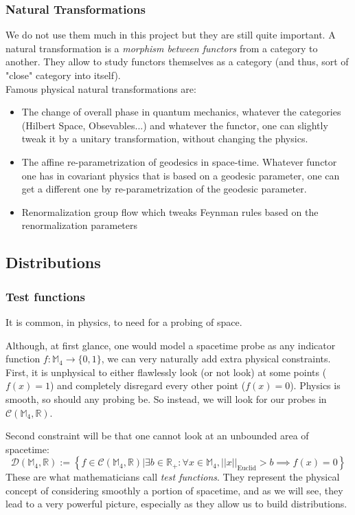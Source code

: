 \documentclass[a4paper,11pt]{article}
\numberwithin{equation}{section}
\theoremstyle{definition}
\begin{document}
    \subsubsection{Natural Transformations}
    We do not use them much in this project but they are still quite important. A natural transformation is a \emph{morphism between functors} from a category to another. They allow to study functors themselves as a category (and thus, sort of "close" category into itself).\\
    Famous physical natural transformations are:
    \begin{itemize}
        \item The change of overall phase in quantum mechanics, whatever the categories (Hilbert Space, Obsevables...) and whatever the functor, one can slightly tweak it by a unitary transformation, without changing the physics.
        \item The affine re-parametrization of geodesics in space-time. Whatever functor one has in covariant physics that is based on a geodesic parameter, one can get a different one by re-parametrization of the geodesic parameter.
        \item Renormalization group flow which tweaks Feynman rules based on the renormalization parameters
    \end{itemize}
\subsection{Distributions}\label{DistribPhy}
\subsubsection{Test functions}
    It is common, in physics, to need for a probing of space.
    
    Although, at first glance, one would model a spacetime probe as any indicator function $f:\mathbb{M}_4 \to \{0,1\}$, we can very naturally add extra physical constraints. First, it is unphysical to either flawlessly look (or not look) at some points ($f(x)=1$) and completely disregard every other point ($f(x)=0$). Physics is smooth, so should any probing be. So instead, we will look for our probes in $\mathcal{C}(\mathbb{M}_4,\mathbb{R})$.

    Second constraint will be that one cannot look at an unbounded area of spacetime:
    $$\mathcal{D}(\mathbb{M}_4,\mathbb{R}):=\left\{f\in \mathcal{C}(\mathbb{M}_4,\mathbb{R})\big| \exists b \in \mathbb{R}_+ :\forall x \in \mathbb{M}_4, ||x||_\mathrm{Euclid}>b \implies f(x)=0\right\}$$
    These are what mathematicians call \emph{test functions}. They represent the physical concept of considering smoothly a portion of spacetime, and as we will see, they lead to a very powerful picture, especially as they allow us to build distributions.
\end{document}
